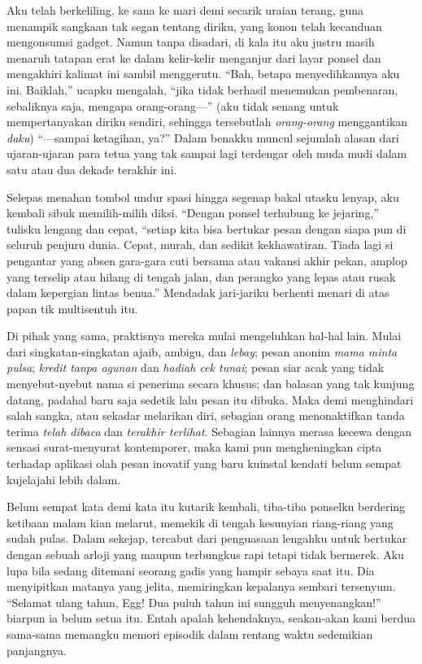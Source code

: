 \documentclass[smalldemyvopaper,11pt,twoside,onecolumn,openright,extrafontsizes]{memoir}
\begin{document}

Aku telah berkeliling, ke sana ke mari demi secarik uraian terang, guna menampik sangkaan tak segan tentang diriku, yang konon telah kecanduan mengonsumsi gadget. Namun tanpa disadari, di kala itu aku justru masih menaruh tatapan erat ke dalam kelir-kelir menganjur dari layar ponsel dan mengakhiri kalimat ini sambil menggerutu. ``Bah, betapa menyedihkannya aku ini. Baiklah,'' ucapku mengalah, ``jika tidak berhasil menemukan pembenaran, sebaliknya saja, mengapa orang-orang---'' (aku tidak senang untuk mempertanyakan diriku sendiri, sehingga tersebutlah \textit{orang-orang} menggantikan \textit{daku}) ``---sampai ketagihan, ya?'' Dalam benakku muncul sejumlah alasan dari ujaran-ujaran para tetua yang tak sampai lagi terdengar oleh muda mudi dalam satu atau dua dekade terakhir ini.


Selepas menahan tombol undur spasi hingga segenap bakal utasku lenyap, aku kembali sibuk memilih-milih diksi. ``Dengan ponsel terhubung ke jejaring,'' tulisku lengang dan cepat, ``setiap kita bisa bertukar pesan dengan siapa pun di seluruh penjuru dunia. Cepat, murah, dan sedikit kekhawatiran. Tiada lagi si pengantar yang absen gara-gara cuti bersama atau vakansi akhir pekan, amplop yang terselip atau hilang di tengah jalan, dan perangko yang lepas atau rusak dalam kepergian lintas benua.'' Mendadak jari-jariku berhenti menari di atas papan tik multisentuh itu.


Di pihak yang sama, praktisnya mereka mulai mengeluhkan hal-hal lain. Mulai dari singkatan-singkatan ajaib, ambigu, dan \textit{lebay}; pesan anonim \textit{mama minta pulsa}; \textit{kredit tanpa agunan} dan \textit{hadiah cek tunai}; pesan siar acak yang tidak menyebut-nyebut nama si penerima secara khusus; dan balasan yang tak kunjung datang, padahal baru saja sedetik lalu pesan itu dibuka. Maka demi menghindari salah sangka, atau sekadar melarikan diri, sebagian orang menonaktifkan tanda terima \textit{telah dibaca} dan \textit{terakhir terlihat}. Sebagian lainnya merasa kecewa dengan sensasi surat-menyurat kontemporer, maka kami pun mengheningkan cipta terhadap aplikasi olah pesan inovatif yang baru kuinstal kendati belum sempat kujelajahi lebih dalam.

Belum sempat kata demi kata itu kutarik kembali, tiba-tiba ponselku berdering ketibaan malam kian melarut, memekik di tengah kesunyian riang-riang yang sudah pulas. Dalam sekejap, tercabut dari penguasaan lengahku untuk bertukar dengan sebuah arloji yang maupun terbungkus rapi tetapi tidak bermerek. Aku lupa bila sedang ditemani seorang gadis yang hampir sebaya saat itu. Dia menyipitkan matanya yang jelita, memiringkan kepalanya sembari tersenyum. ``Selamat ulang tahun, Egg! Dua puluh tahun ini sungguh menyenangkan!'' biarpun ia belum setua itu. Entah apalah kehendaknya, seakan-akan kami berdua sama-sama memangku memori episodik dalam rentang waktu sedemikian panjangnya.
\end{document}
